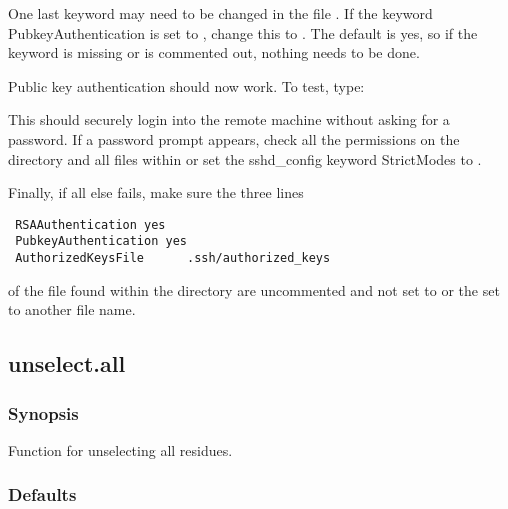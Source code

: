 
 One last keyword may need to be changed in the file .  If the keyword PubkeyAuthentication is set to , change this to .  The default is yes, so if the keyword is missing or is commented out, nothing needs to be done. 
  

 Public key authentication should now work.  To test, type: 
  


 This should securely login into the remote machine without asking for a password.  If a password prompt appears, check all the permissions on the directory  and all files within or set the sshd\_config keyword StrictModes to . 
  




 Finally, if all else fails, make sure the three lines 
  

 {\footnotesize \begin{verbatim} 
 RSAAuthentication yes 
 PubkeyAuthentication yes 
 AuthorizedKeysFile      .ssh/authorized_keys 
 \end{verbatim}} 

 of the file  found within the directory  are uncommented and not set to  or the  set to another file name. 
  

  

 \newpage 

 \subsection{unselect.all} 

  
 \subsubsection{Synopsis} 

 Function for unselecting all residues. 
  

  
 \subsubsection{Defaults} 

